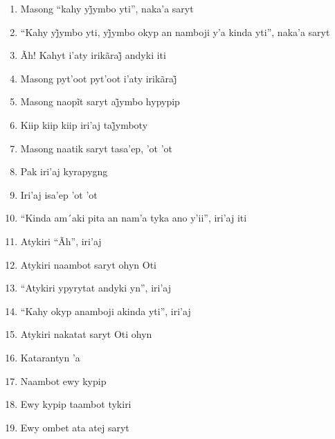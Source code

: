 \begin{enumerate}
 \begin{center}\end{center}

 \item Masong ``kahy yj̃ymbo yti'', naka’a saryt

 \item ``Kahy yj̃ymbo yti, yj̃ymbo okyp an namboji y’a kinda yti'', naka’a saryt

 \item Ãh! Kahyt i’aty irikãraj̃ andyki iti

 \item Masong pyt’oot pyt’oot i’aty irikãraj̃

 \item Masong naopĩt saryt aj̃ymbo hypypip

 \item Kiip kiip kiip iri’aj taj̃ymboty

 \item Masong naatik saryt tasa'ep, 'ot 'ot

 \item Pak iri'aj kyrapygng

 \item Iri'aj isa'ep 'ot 'ot

 \item ``Kinda am´aki pita an nam'a tyka ano y'ii'', iri'aj iti

 \item Atykiri ``Ãh'', iri'aj

 \begin{center}\end{center}

 \item Atykiri naambot saryt ohyn Oti

 \item ``Atykiri ypyrytat andyki yn'', iri'aj

 \item ``Kahy okyp anamboji akinda yti'', iri'aj

 \item Atykiri nakatat saryt Oti ohyn

 \item Katarantyn 'a

 \item Naambot ewy kypip

 \item Ewy kypip taambot tykiri

 \item Ewy ombet ata atej saryt


\end{enumerate}
